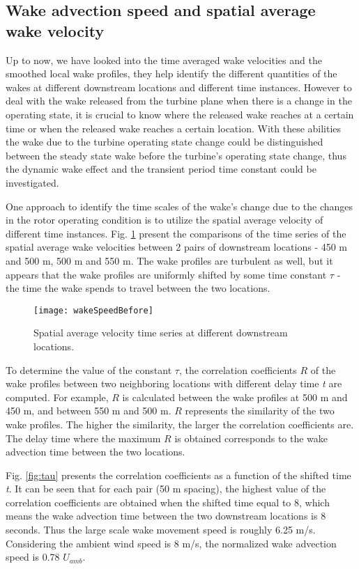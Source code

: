 \documentclass{umthesis}
\begin{document}
\subsection{Wake advection speed and spatial average wake velocity}
Up to now, we have looked into the time averaged wake velocities and the smoothed local wake profiles, they help identify the different quantities of the wakes at different downstream locations and different time instances. However to deal with the wake released from the turbine plane when there is a change in the operating state, it is crucial to know where the released wake reaches at a certain time or when the released wake reaches a certain location. With these abilities the wake due to the turbine operating state change could be distinguished between the steady state wake before the turbine's operating state change, thus the dynamic wake effect and the transient period time constant could be investigated.

One approach to identify the time scales of the wake’s change due to the changes in the rotor operating condition is to utilize the spatial average velocity of different time instances. Fig. \ref{fig:wakeSpeedBefore} present the comparisons of the time series of the spatial average wake velocities between 2 pairs of downstream locations - 450 m and 500 m, 500 m and 550 m. The wake profiles are turbulent as well, but it appears that the wake profiles are uniformly shifted by some time constant $\tau$ - the time the wake spends to travel between the two locations.

\begin{figure}
  \centering
  \texttt{[image: wakeSpeedBefore]}
  \caption{Spatial average velocity time series at different downstream locations.}\label{fig:wakeSpeedBefore}
\end{figure}

To determine the value of the constant $\tau$, the correlation coefficients $R$ of the wake profiles between two neighboring locations with different delay time \textit{t} are computed. For example, $R$ is calculated between the wake profiles at 500 m and 450 m, and between 550 m and 500 m. $R$ represents the similarity of the two wake profiles. The higher the similarity, the larger the correlation coefficients are. The delay time where the maximum $R$ is obtained corresponds to the wake advection time between the two locations. 

Fig. \ref{fig:tau} presents the correlation coefficients as a function of the shifted time \textit{t}. It can be seen that for each pair (50 m spacing), the highest value of the correlation coefficients are obtained when the shifted time equal to 8, which means the wake advection time between the two downstream locations is 8 seconds. Thus the large scale wake movement speed is roughly 6.25 m/s. Considering the ambient wind speed is 8 m/s, the normalized wake advection speed is 0.78 $U_{amb}$.
\end{document}
